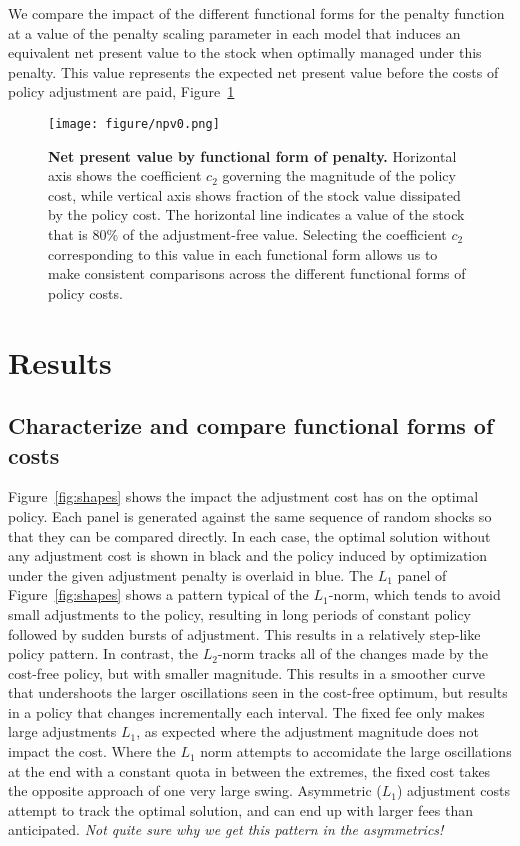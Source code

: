 \documentclass[authoryear, review, 12pt]{elsarticle}
\newcommand{\cdb}[1]{{\it \color{darkgreen} #1}}
\begin{document}
We compare the impact of the different functional forms for the penalty
function at a value of the penalty scaling parameter in each model that
induces an equivalent net present value to the stock when optimally
managed under this penalty. This value represents the expected net
present value before the costs of policy adjustment are paid, Figure~\ref{fig:apples}

  \begin{figure}
    \begin{center}
\texttt{[image: figure/npv0.png]}
\caption{\textbf{Net present value by functional form of penalty.} Horizontal axis shows the coefficient $c_2$ governing the magnitude of the policy cost, while vertical axis shows fraction of the stock value dissipated by the policy cost.  The horizontal line indicates a value of the stock that is 80\% of the adjustment-free value. Selecting the coefficient $c_2$ corresponding to this value in each functional form allows us to make consistent comparisons across the different functional forms of policy costs.  }
\label{fig:apples}
\end{center}
\end{figure}


\section{Results}
\subsection{Characterize and compare functional forms of costs}

Figure~\ref{fig:shapes} shows the impact the adjustment cost has on the optimal policy.   Each panel is generated against the same sequence of random shocks so that they can be compared directly.  In each case, the optimal solution without any adjustment cost is shown in black and the policy induced by optimization under the given adjustment penalty is overlaid in blue.  The $L_1$ panel of Figure~\ref{fig:shapes} shows a pattern typical of the $L_1$-norm, which tends to avoid small adjustments to the policy, resulting in long periods of constant policy followed by sudden bursts of adjustment. This results in a relatively step-like policy pattern.  In contrast, the $L_2$-norm tracks all of the changes made by the cost-free policy, but with smaller magnitude.  This results in a smoother curve that undershoots the larger oscillations seen in the cost-free optimum, but results in a policy that changes incrementally each interval.  The fixed fee only makes large adjustments $L_1$, as expected where the adjustment magnitude does not impact the cost.  Where the $L_1$ norm attempts to accomidate the large oscillations at the end with a constant quota in between the extremes, the fixed cost takes the opposite approach of one very large swing.  Asymmetric ($L_1$) adjustment costs attempt to track the optimal solution, and can end up with larger fees than anticipated.  \cdb{Not quite sure why we get this pattern in the asymmetrics!}
\end{document}
